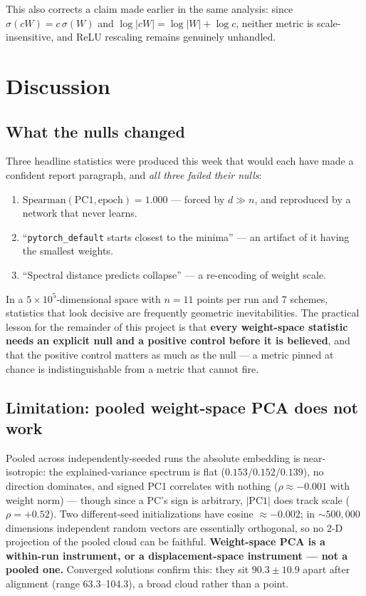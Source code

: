 \documentclass[11pt]{article}
\begin{document}
This also corrects a claim made earlier in the same analysis: since $\sigma(cW) = c\,\sigma(W)$
and $\log|cW| = \log|W| + \log c$, neither metric is scale-insensitive, and ReLU rescaling
remains genuinely unhandled.

\section{Discussion}

\subsection{What the nulls changed}

Three headline statistics were produced this week that would each have made a confident report
paragraph, and \emph{all three failed their nulls}:

\begin{enumerate}
\item $\mathrm{Spearman}(\mathrm{PC1},\mathrm{epoch}) = 1.000$ --- forced by $d\gg n$, and
reproduced by a network that never learns.
\item ``\texttt{pytorch\_default} starts closest to the minima'' --- an artifact of it having the
smallest weights.
\item ``Spectral distance predicts collapse'' --- a re-encoding of weight scale.
\end{enumerate}

In a $5\times10^5$-dimensional space with $n=11$ points per run and 7 schemes, statistics that
look decisive are frequently geometric inevitabilities. The practical lesson for the remainder of
this project is that \textbf{every weight-space statistic needs an explicit null and a positive
control before it is believed}, and that the positive control matters as much as the null --- a
metric pinned at chance is indistinguishable from a metric that cannot fire.

\subsection{Limitation: pooled weight-space PCA does not work}

Pooled across independently-seeded runs the absolute embedding is near-isotropic: the
explained-variance spectrum is flat ($0.153 / 0.152 / 0.139$), no direction dominates, and signed
PC1 correlates with nothing ($\rho\approx-0.001$ with weight norm) --- though since a PC's sign is
arbitrary, $|\mathrm{PC1}|$ does track scale ($\rho = +0.52$). Two different-seed initializations
have cosine $\approx-0.002$; in $\sim\!500{,}000$ dimensions independent random vectors are
essentially orthogonal, so no 2-D projection of the pooled cloud can be faithful.
\textbf{Weight-space PCA is a within-run instrument, or a displacement-space instrument --- not a
pooled one.} Converged solutions confirm this: they sit $90.3 \pm 10.9$ apart after alignment
(range 63.3--104.3), a broad cloud rather than a point.
\end{document}
